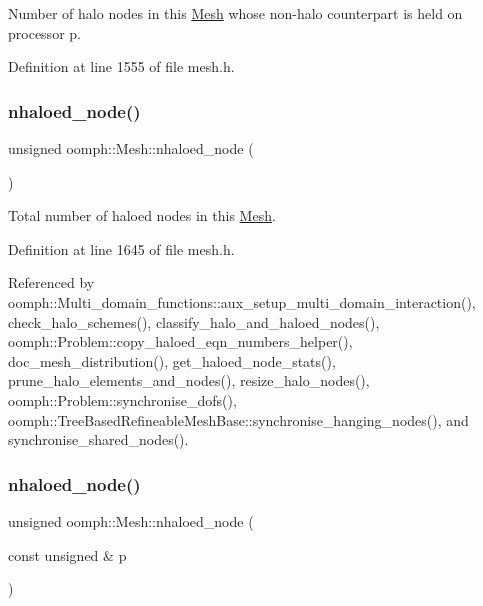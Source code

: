 Number of halo nodes in this \hyperlink{classoomph_1_1Mesh}{Mesh} whose non-\/halo counterpart is held on processor p. 



Definition at line 1555 of file mesh.\+h.

\mbox{\label{classoomph_1_1Mesh_ad3202cdf7b1b35f8b3db51430dbbb8c6}} 
\subsubsection{\texorpdfstring{nhaloed\+\_\+node()}{nhaloed\_node()}\hspace{0.1cm}{\footnotesize\ttfamily [1/2]}}
{\footnotesize\ttfamily unsigned oomph\+::\+Mesh\+::nhaloed\+\_\+node (\begin{DoxyParamCaption}{ }\end{DoxyParamCaption})\hspace{0.3cm}{\ttfamily [inline]}}



Total number of haloed nodes in this \hyperlink{classoomph_1_1Mesh}{Mesh}. 



Definition at line 1645 of file mesh.\+h.



Referenced by oomph\+::\+Multi\+\_\+domain\+\_\+functions\+::aux\+\_\+setup\+\_\+multi\+\_\+domain\+\_\+interaction(), check\+\_\+halo\+\_\+schemes(), classify\+\_\+halo\+\_\+and\+\_\+haloed\+\_\+nodes(), oomph\+::\+Problem\+::copy\+\_\+haloed\+\_\+eqn\+\_\+numbers\+\_\+helper(), doc\+\_\+mesh\+\_\+distribution(), get\+\_\+haloed\+\_\+node\+\_\+stats(), prune\+\_\+halo\+\_\+elements\+\_\+and\+\_\+nodes(), resize\+\_\+halo\+\_\+nodes(), oomph\+::\+Problem\+::synchronise\+\_\+dofs(), oomph\+::\+Tree\+Based\+Refineable\+Mesh\+Base\+::synchronise\+\_\+hanging\+\_\+nodes(), and synchronise\+\_\+shared\+\_\+nodes().

\mbox{\label{classoomph_1_1Mesh_a56cd53571d9ed9f85a84da7b567955ef}} 
\subsubsection{\texorpdfstring{nhaloed\+\_\+node()}{nhaloed\_node()}\hspace{0.1cm}{\footnotesize\ttfamily [2/2]}}
{\footnotesize\ttfamily unsigned oomph\+::\+Mesh\+::nhaloed\+\_\+node (\begin{DoxyParamCaption}\item[{const unsigned \&}]{p }\end{DoxyParamCaption})\hspace{0.3cm}{\ttfamily [inline]}}



